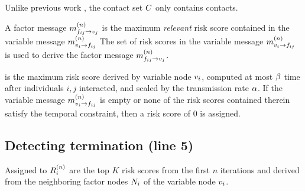 
    Unlike previous work \cite{Ayday2021}, the contact set $C$ only contains  contacts. 
 
    A factor message $\vFactorMsg[n]{ij}{j}$ is the maximum \emph{relevant} risk score contained in the variable message $\vVariableMsg[n]{i}{ij}$
    The set of risk scores in the variable message $\vVariableMsg[n]{i}{ij}$ is used to derive the factor message $\vFactorMsg[n]{ij}{j}$.

    is the maximum risk score derived by variable node $\vVariable[i]$, computed at most $\beta$ time after individuals $i, j$ interacted, and scaled by the transmission rate $\alpha$. If the variable message $\vVariableMsg[n]{i}{ij}$ is empty or none of the risk scores contained therein satisfy the temporal constraint, then a risk score of 0 is assigned.

\subsection{Detecting termination (line 5)}

Assigned to $\iScores{i}{n}$ are the top $K$ risk scores from the first $n$ iterations and derived from the neighboring factor nodes $N_i$ of the variable node $\vVariable[i]$.

